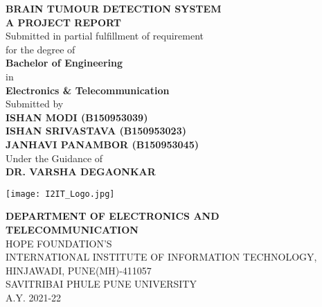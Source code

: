 \begin{center}
\vspace{0.8cm}
{\bf \LARGE BRAIN TUMOUR DETECTION SYSTEM} \\ \vspace{1 cm}
{\large \bf A PROJECT REPORT}\\ \vspace{0.6 cm}
{\large Submitted in partial fulfillment of requirement \\ for the degree of}\\ \vspace{0.5 cm}
{\large \textbf{Bachelor of Engineering}}\\
{\large in}\\
{\large \textbf{Electronics \& Telecommunication }}\\ \vspace{0.3 cm}
{\large Submitted by}\\ \vspace{0.3 cm}
{\large \bf  ISHAN MODI (B150953039)}\\ \vspace{0.1 cm}
{\large \bf  ISHAN SRIVASTAVA (B150953023)}\\ \vspace{0.1 cm}
{\large \bf  JANHAVI PANAMBOR (B150953045)}\\ \vspace{0.5 cm}
{ Under the Guidance of}\\ \vspace{0.2 cm}
{ \large \bf  DR. VARSHA DEGAONKAR }\\ \vspace{0.05 cm}
\begin{figure*}[!h]
\centering
\texttt{[image: I2IT\_Logo.jpg]}
\end{figure*} \vspace{0.05 cm} 
{\textbf{DEPARTMENT OF ELECTRONICS AND TELECOMMUNICATION}}\\%
{HOPE FOUNDATION'S}\\ 
{INTERNATIONAL INSTITUTE OF INFORMATION TECHNOLOGY,} \\%
{HINJAWADI, PUNE(MH)-411057}\\ %
{SAVITRIBAI PHULE PUNE UNIVERSITY}\\ %
{A.Y. 2021-22}
\end{center} 